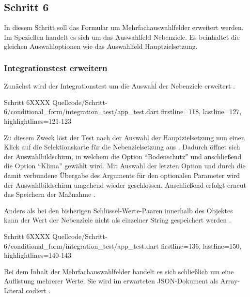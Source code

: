 \ifincludeall \clearpage \fi

\subsection{Schritt 6}

In diesem Schritt soll das Formular um Mehrfachauswahlfelder erweitert werden.
Im Speziellen handelt es sich um das Auswahlfeld Nebenziele.
Es beinhaltet die gleichen Auswahloptionen wie das Auswahlfeld Hauptzielsetzung.

\subsubsection{Integrationstest erweitern}

Zunächst wird der Integrationstest um die Auswahl der Nebenziele erweitert \Lst{\ref{lst:Schritt6tabSelectionCard}}.

\begin{alexlisting}{Schritt 6}{XXXX}
  {Quellcode/Schritt-6/conditional_form/integration_test/app_test.dart}
  {firstline=118, lastline=127, highlightlines={121-123}}
  \label{lst:Schritt6tabSelectionCard}
\end{alexlisting}

Zu diesem Zweck löst der Test nach der Auswahl der Hauptzielsetzung  nun einen Klick auf die Selektionskarte für die Nebenzielsetzung aus .
Dadurch öffnet sich der Auswahlbildschirm,
in welchem die Option \enquote{Bodenschutz}  und anschließend die Option \enquote{Klima}  gewählt wird.
Mit Auswahl der letzten Option
und durch die damit verbundene Übergabe des Arguments  für den optionalen Parameter  wird der Auswahlbildschirm umgehend wieder geschlossen.
Anschließend erfolgt erneut das Speichern der Maßnahme .



Anders als bei den bisherigen Schlüssel-Werte-Paaren innerhalb des Objektes  kann der Wert der Nebenziele nicht als einzelner String gespeichert werden \Lst{\ref{lst:Schritt6expectedJson}}.

\begin{alexlisting}{Schritt 6}{XXXX}
  {Quellcode/Schritt-6/conditional_form/integration_test/app_test.dart}
  {firstline=136, lastline=150, highlightlines={140-143}}
  \label{lst:Schritt6expectedJson}
\end{alexlisting}

Bei dem Inhalt der Mehrfachauswahlfelder handelt es sich schließlich um eine Auflistung mehrerer Werte.
Sie wird im erwarteten JSON-Dokument als Array-Literal codiert .



